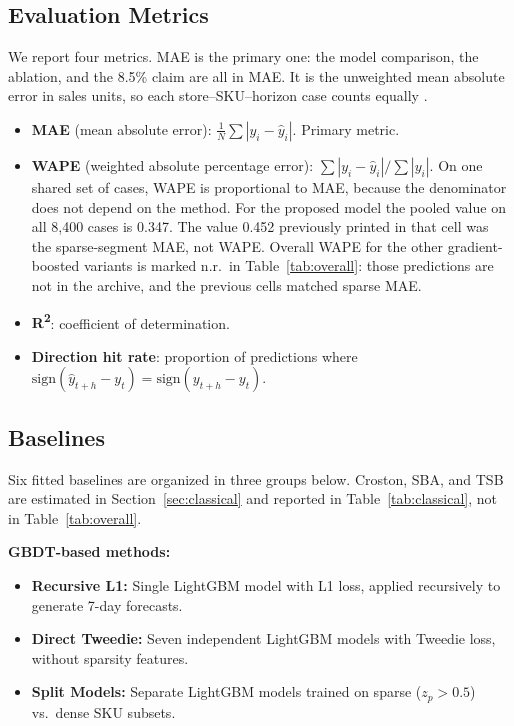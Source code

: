 \documentclass[review,authoryear]{elsarticle}
\begin{document}
\subsection{Evaluation Metrics}
\label{sec:metrics}

We report four metrics. MAE is the primary one: the model comparison, the ablation, and the 8.5\% claim are all in MAE. It is the unweighted mean absolute error in sales units, so each store--SKU--horizon case counts equally \citep{hyndman2006accuracy}.

\begin{itemize}
    \item \textbf{MAE} (mean absolute error): $\frac{1}{N}\sum |y_i - \hat{y}_i|$. Primary metric.
    \item \textbf{WAPE} (weighted absolute percentage error): $\sum|y_i - \hat{y}_i| / \sum|y_i|$. On one shared set of cases, WAPE is proportional to MAE, because the denominator does not depend on the method. For the proposed model the pooled value on all 8{,}400 cases is 0.347. The value 0.452 previously printed in that cell was the sparse-segment MAE, not WAPE. Overall WAPE for the other gradient-boosted variants is marked n.r.\ in Table~\ref{tab:overall}: those predictions are not in the archive, and the previous cells matched sparse MAE.
    \item \textbf{R\textsuperscript{2}}: coefficient of determination.
    \item \textbf{Direction hit rate}: proportion of predictions where $\text{sign}(\hat{y}_{t+h} - y_t) = \text{sign}(y_{t+h} - y_t)$.
\end{itemize}

\subsection{Baselines}

Six fitted baselines are organized in three groups below. Croston, SBA, and TSB are estimated in Section~\ref{sec:classical} and reported in Table~\ref{tab:classical}, not in Table~\ref{tab:overall}.

\textbf{GBDT-based methods:}
\begin{itemize}
    \item \textbf{Recursive L1:} Single LightGBM model with L1 loss, applied recursively to generate 7-day forecasts.
    \item \textbf{Direct Tweedie:} Seven independent LightGBM models with Tweedie loss, without sparsity features.
    \item \textbf{Split Models:} Separate LightGBM models trained on sparse ($z_p > 0.5$) vs.\ dense SKU subsets.
\end{itemize}
\end{document}
